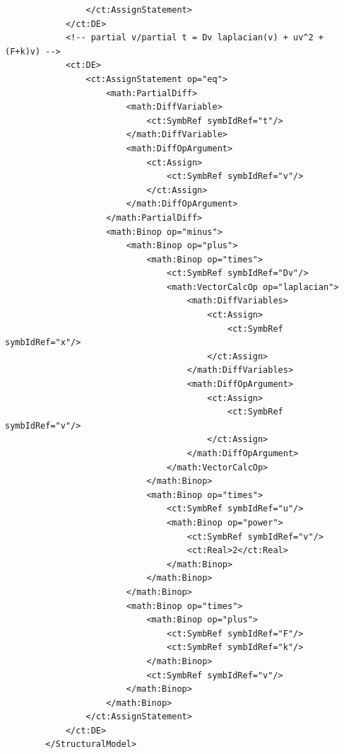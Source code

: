 \begin{lstlisting}
                </ct:AssignStatement>
            </ct:DE>
            <!-- partial v/partial t = Dv laplacian(v) + uv^2 + (F+k)v) -->
            <ct:DE>
                <ct:AssignStatement op="eq">
                    <math:PartialDiff>
                        <math:DiffVariable>
                            <ct:SymbRef symbIdRef="t"/>
                        </math:DiffVariable>
                        <math:DiffOpArgument>
                            <ct:Assign>
                                <ct:SymbRef symbIdRef="v"/>
                            </ct:Assign>
                        </math:DiffOpArgument>
                    </math:PartialDiff>
                    <math:Binop op="minus">
                        <math:Binop op="plus">
                            <math:Binop op="times">
                                <ct:SymbRef symbIdRef="Dv"/>
                                <math:VectorCalcOp op="laplacian">
                                    <math:DiffVariables>
                                        <ct:Assign>
                                            <ct:SymbRef symbIdRef="x"/>
                                        </ct:Assign>
                                    </math:DiffVariables>
                                    <math:DiffOpArgument>
                                        <ct:Assign>
                                            <ct:SymbRef symbIdRef="v"/>
                                        </ct:Assign>
                                    </math:DiffOpArgument>
                                </math:VectorCalcOp>
                            </math:Binop>
                            <math:Binop op="times">
                                <ct:SymbRef symbIdRef="u"/>
                                <math:Binop op="power">
                                    <ct:SymbRef symbIdRef="v"/>
                                    <ct:Real>2</ct:Real>
                                </math:Binop>
                            </math:Binop>
                        </math:Binop>
                        <math:Binop op="times">
                            <math:Binop op="plus">
                                <ct:SymbRef symbIdRef="F"/>
                                <ct:SymbRef symbIdRef="k"/>
                            </math:Binop>
                            <ct:SymbRef symbIdRef="v"/>
                        </math:Binop>
                    </math:Binop>
                </ct:AssignStatement>
            </ct:DE>
        </StructuralModel>
\end{lstlisting}


\bigskip
